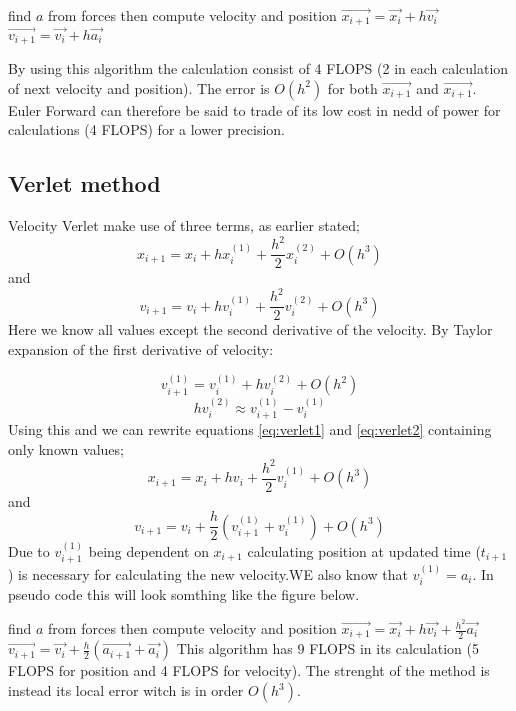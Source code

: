 \documentclass[twoside,twocolumn]{article}
\begin{document}
\begin{algorithmic}[H]

\State find $a$ from forces
\State then compute velocity and position
\State $\vec{  x_{i+1}} = \vec{x_{i}} + h \vec{v_i}$
\State $\vec{  v_{i+1}} = \vec{v_{i}} + h \vec{a_i}$
\EndFor
\end{algorithmic}
By using this algorithm the calculation consist of 4 FLOPS (2 in each calculation of next velocity and position). The error is $O(h^2)$ for both $ \vec{  x_{i+1}}$ and $\vec{  x_{i+1}}$. Euler Forward can therefore be said to trade of its low cost in nedd of power for calculations (4 FLOPS) for a lower precision.

\subsection{Verlet method}
Velocity Verlet make use of three terms, as earlier stated;
\begin{equation}\label{eq:verlet1}
 x_{i+1} =x_{i}+ h x_{i}^{(1)} +\frac{h^2}{2} x_{i}^{(2)} + O(h^3)
\end{equation}
and
\begin{equation} \label{eq:verlet2}
v_{i+1} =v_{i}+ h v_{i}^{(1)}+\frac{h^2}{2} v_{i}^{(2)} + O(h^3)
\end{equation}
Here we know all values except the second derivative of the velocity. By Taylor expansion of the first derivative of velocity:

\[
v_{i+1}^{(1)} =v_{i}^{(1)}+ h v_{i}^{(2)} + O(h^2)
\] 
\[
hv_{i}^{(2)} \approx v_{i+1}^{(1)}-  v_{i}^{(1)}
\] 
Using this and we can rewrite equations \ref{eq:verlet1} and \ref{eq:verlet2} containing only known values;
\begin{equation}
x_{i+1} =x_{i}+ h v_{i} +\frac{h^2}{2} v_{i}^{(1)} + O(h^3)
\end{equation}
and
\begin{equation}
v_{i+1} =v_{i}+ \frac{h}{2} \left( v_{i+1}^{(1)}+v_{i}^{(1)} \right)+ O(h^3)
\end{equation}
Due to $v_{i+1}^{(1)}$ being dependent on $x_{i+1}$ calculating position at updated time ($t_{i+1}$) is necessary for calculating the new velocity.WE also know that $v_{i}^{(1)} = a_i $. In pseudo code this will look somthing like the figure below.
\begin{algorithmic}[H]
\State find $a$ from forces
\State then compute velocity and position
\State $\vec{  x_{i+1}} = \vec{x_{i}} + h \vec{v_i}+\frac{h^2}{2}\vec{a_i}$
\State $\vec{  v_{i+1}} = \vec{v_{i}} + \frac{h}{2} (\vec{a_{i+1}}+\vec{a_i})$
\EndFor
This algorithm has 9 FLOPS in its calculation (5 FLOPS for position and 4 FLOPS for velocity). The strenght of the method is instead its local error witch is in order $O(h^3)$.
\end{algorithmic}
\end{document}
